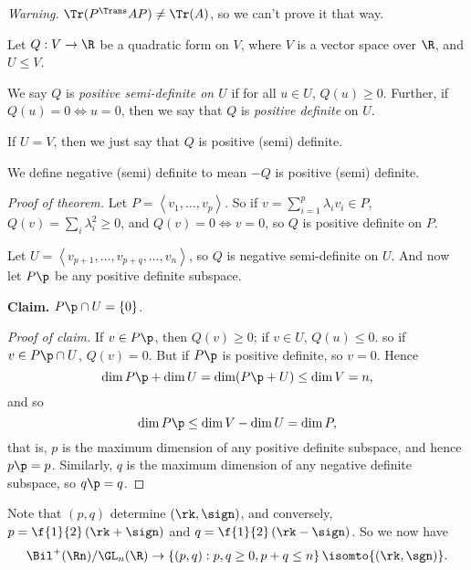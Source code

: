 \emph{Warning.} $\Tr(P^\Trans AP) \neq \Tr(A)$, so we can't prove it that way.

\begin{definition}
	Let $Q:V\to\R$ be a quadratic form on $V$,  where $V$ is a vector space over $\R$, and $U\leq V$.

	We say $Q$ is \emph{positive semi-definite on $U$} if for all $u\in U$, $Q(u)\geq 0$. Further, if $Q(u)=0 \iff u=0$, then we say that $Q$ is \emph{positive definite} on $U$. %
	
	If $U=V$, then we just say that $Q$ is positive (semi) definite.

	We define negative (semi) definite to mean $-Q$ is positive (semi) definite. %
\end{definition}

\vspace{-3pt}

\begin{proof}
	[Proof of theorem] Let $P=\left\langle v_1,\ldots,v_p \right\rangle$. So if $v=\sum_{i=1}^p \lambda_i v_i \in P$, $Q(v)=\sum_i \lambda_i^2\geq 0$, and $Q(v)=0 \iff v=0$, so $Q$ is positive definite on $P$. %
	
	Let $U=\left\langle v_{p+1},\ldots,v_{p+q},\ldots,v_n \right\rangle$, so $Q$ is negative semi-definite on $U$. And now let $P\p$ be any positive definite subspace. %
	
	\textbf{Claim.} $P\p\cap U=\{0\}$.
	
	\emph{Proof of claim.} If $v\in P\p$, then $Q(v)\geq 0$; if $v\in U$, $Q(u)\leq 0$. so if $v\in P\p\cap U$, $Q(v)=0$. But if $P\p$ is positive definite, so $v=0$. Hence %
	\begin{equation*}
		\dim P\p+\dim U = \dim(P\p+U) \leq \dim V = n,
	\end{equation*}
	and so
	\begin{equation*}
		\dim P\p \leq  \dim V - \dim U = \dim P,
	\end{equation*}
	that is, $p$ is the maximum dimension of any positive definite subspace, and hence $p\p=p$. Similarly, $q$ is the maximum dimension of any negative definite subspace, so $q\p=q$. %
\end{proof}

Note that $(p,q)$ determine $(\rk,\sign)$, and conversely, $p=\f{1}{2}\left( \rk+\sign \right)$ and $q=\f{1}{2}\left( \rk-\sign \right)$. So we now have
\begin{equation*}
	\Bil^+(\Rn)/\GL_n(\R)
	\to \left\{(p,q) : p,q\geq 0, p+q\leq n \right\} \isomto \{(\rk,\sgn)\}.
\end{equation*}

